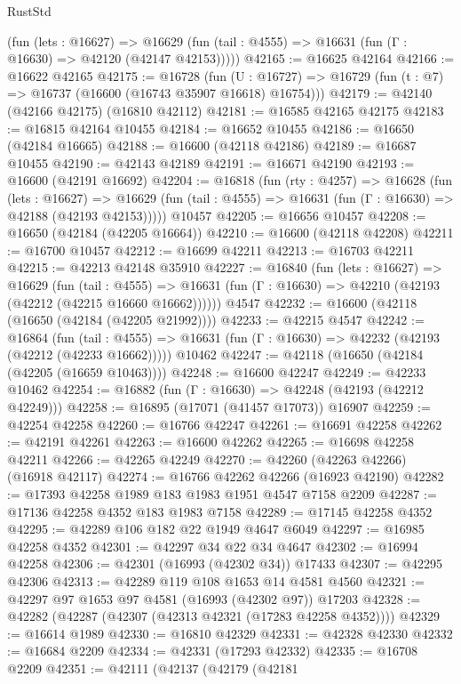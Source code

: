 \begin{lexlean}{RustStd}
\begin{coremodule}
{\begin{coremodule}
{{{{{{{{{{{{{{{{{{{{{{{{{{{{{{{{{{{{{{{{{{{{{{{{{{{{{{{      (fun (lets : @16627) =>
      @16629 (fun (tail : @4555) => @16631 (fun (Γ : @16630) => @42120 (@42147 @42153)))))
@42165 := @16625 @42164
@42166 := @16622 @42165
@42175 := @16728
    (fun (U : @16727) => @16729 (fun (t : @7) => @16737 (@16600 (@16743 @35907 @16618) @16754)))
@42179 := @42140 (@42166 @42175) (@16810 @42112)
@42181 := @16585 @42165 @42175
@42183 := @16815 @42164 @10455
@42184 := @16652 @10455
@42186 := @16650 (@42184 @16665)
@42188 := @16600 (@42118 @42186)
@42189 := @16687 @10455
@42190 := @42143 @42189
@42191 := @16671 @42190
@42193 := @16600 (@42191 @16692)
@42204 := @16818
    (fun (rty : @4257) =>
    @16628
      (fun (lets : @16627) =>
      @16629 (fun (tail : @4555) => @16631 (fun (Γ : @16630) => @42188 (@42193 @42153)))))
    @10457
@42205 := @16656 @10457
@42208 := @16650 (@42184 (@42205 @16664))
@42210 := @16600 (@42118 @42208)
@42211 := @16700 @10457
@42212 := @16699 @42211
@42213 := @16703 @42211
@42215 := @42213 @42148 @35910
@42227 := @16840
    (fun (lets : @16627) =>
    @16629
      (fun (tail : @4555) =>
      @16631 (fun (Γ : @16630) => @42210 (@42193 (@42212 (@42215 @16660 @16662))))))
    @4547
@42232 := @16600 (@42118 (@16650 (@42184 (@42205 @21992))))
@42233 := @42215 @4547
@42242 := @16864
    (fun (tail : @4555) => @16631 (fun (Γ : @16630) => @42232 (@42193 (@42212 (@42233 @16662)))))
    @10462
@42247 := @42118 (@16650 (@42184 (@42205 (@16659 @10463))))
@42248 := @16600 @42247
@42249 := @42233 @10462
@42254 := @16882 (fun (Γ : @16630) => @42248 (@42193 (@42212 @42249)))
@42258 := @16895 (@17071 (@41457 @17073)) @16907
@42259 := @42254 @42258
@42260 := @16766 @42247
@42261 := @16691 @42258
@42262 := @42191 @42261
@42263 := @16600 @42262
@42265 := @16698 @42258 @42211
@42266 := @42265 @42249
@42270 := @42260 (@42263 @42266) (@16918 @42117)
@42274 := @16766 @42262 @42266 (@16923 @42190)
@42282 := @17393 @42258 @1989 @183 @1983 @1951 @4547 @7158 @2209
@42287 := @17136 @42258 @4352 @183 @1983 @7158
@42289 := @17145 @42258 @4352
@42295 := @42289 @106 @182 @22 @1949 @4647 @6049
@42297 := @16985 @42258 @4352
@42301 := @42297 @34 @22 @34 @4647
@42302 := @16994 @42258
@42306 := @42301 (@16993 (@42302 @34)) @17433
@42307 := @42295 @42306
@42313 := @42289 @119 @108 @1653 @14 @4581 @4560
@42321 := @42297 @97 @1653 @97 @4581 (@16993 (@42302 @97)) @17203
@42328 := @42282 (@42287 (@42307 (@42313 @42321 (@17283 @42258 @4352))))
@42329 := @16614 @1989
@42330 := @16810 @42329
@42331 := @42328 @42330
@42332 := @16684 @2209
@42334 := @42331 (@17293 @42332)
@42335 := @16708 @2209
@42351 := @42111
    (@42137
      (@42179
        (@42181
}}}}}}}}}}}}}}}}}}}}}}}}}}}}}}}}}}}}}}}}}}}}}}}}}}}}}}}
\end{coremodule}}
\end{coremodule}
\end{lexlean}
